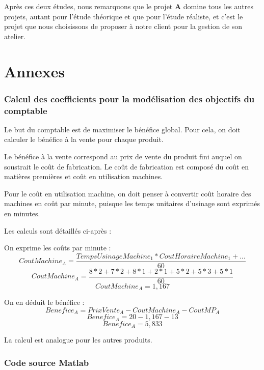 \documentclass[a4paper,10pt]{article}
\begin{document}
Après ces deux études, nous remarquons que le projet \textbf{A} domine tous les autres projets, autant pour l'étude théorique et que pour l'étude réaliste, et c'est le projet que nous choisissons de proposer à notre client pour la gestion de son atelier.



\newpage
\part{Annexes}
\appendix

\section{Calcul des coefficients pour la modélisation des objectifs du comptable}
\label{annexe}

Le but du comptable est de maximiser le bénéfice global. Pour cela, on doit
calculer le bénéfice à la vente pour chaque produit.

Le bénéfice à la vente correspond au prix de vente du produit fini auquel
on soustrait le coût de fabrication. Le coût de fabrication est composé du
coût en matières premières et coût en utilisation machines.

Pour le coût en utilisation machine, on doit penser à convertir coût horaire
des machines en coût par minute, puisque les temps unitaires d'usinage sont
exprimés en minutes.

Les calculs sont détaillés ci-après :

On exprime les coûts par minute :
$$ CoutMachine_A = \frac{TempsUsinageMachine_1*CoutHoraireMachine_1 + ...}{60} $$
$$ CoutMachine_A = \frac{8*2+7*2+8*1+2*1+5*2+5*3+5*1}{60} $$
$$ CoutMachine_A = 1,167 $$

On en déduit le bénéfice :
$$ Benefice_A = PrixVente_A - CoutMachine_A - CoutMP_A $$
$$ Benefice_A = 20 - 1,167 - 13 $$
$$ Benefice_A = 5,833 $$

La calcul est analogue pour les autres produits.


\newpage
\section{Code source Matlab}

\end{document}
